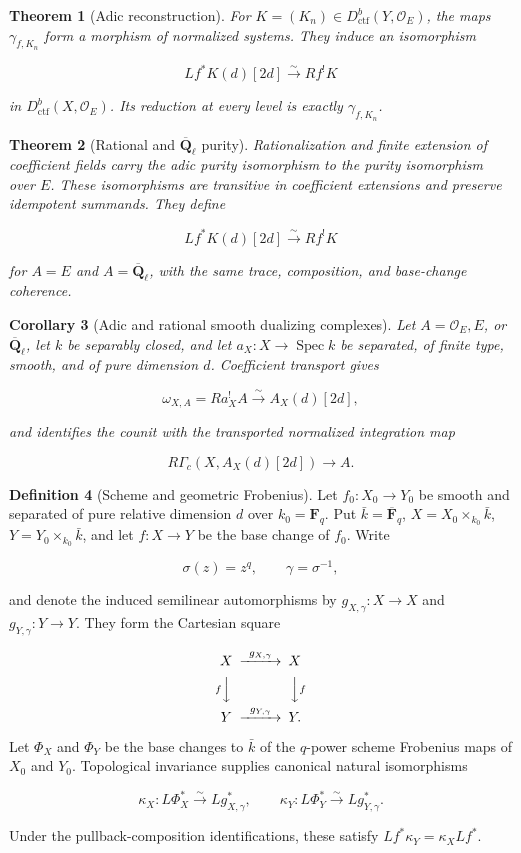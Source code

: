 \documentclass[10pt]{article}
\newtheorem{theorem}{Theorem}[section]
\newtheorem{corollary}[theorem]{Corollary}
\theoremstyle{definition}
\newtheorem{definition}[theorem]{Definition}
\newcommand{\Qlb}{\overline{\mathbf Q}_\ell}
\newcommand{\OO}{\mathcal O}
\newcommand{\Dctf}{D^b_{\mathrm{ctf}}}
\begin{document}
\begin{theorem}[Adic reconstruction]
For \(K=(K_n)\in\Dctf(Y,\OO_E)\), the maps
\(\gamma_{f,K_n}\) form a morphism of normalized systems.  They induce an
isomorphism

\[
 Lf^*K(d)[2d]\xrightarrow{\sim}Rf^!K
\]

in \(\Dctf(X,\OO_E)\).  Its reduction at every level is exactly
\(\gamma_{f,K_n}\).
\end{theorem}

\begin{theorem}[Rational and \(\Qlb\) purity]
Rationalization and finite extension of coefficient fields carry the adic
purity isomorphism to the purity isomorphism over \(E\).  These isomorphisms
are transitive in coefficient extensions and preserve idempotent summands.
They define

\[
 Lf^*K(d)[2d]\xrightarrow{\sim}Rf^!K
\]

for \(A=E\) and \(A=\Qlb\), with the same trace, composition, and base-change
coherence.
\end{theorem}

\begin{corollary}[Adic and rational smooth dualizing complexes]
Let \(A=\OO_E,E\), or \(\Qlb\), let \(k\) be separably closed, and let
\(a_X:X\to\operatorname{Spec}k\) be separated, of finite type, smooth, and
of pure dimension \(d\).  Coefficient transport gives

\[
 \omega_{X,A}=Ra_X^!A\xrightarrow{\sim}A_X(d)[2d],
\]

and identifies the counit with the transported normalized integration map

\[
 R\Gamma_c(X,A_X(d)[2d])\longrightarrow A.
\]
\end{corollary}

\begin{definition}[Scheme and geometric Frobenius]
Let \(f_0:X_0\to Y_0\) be smooth and separated of pure relative dimension
\(d\) over \(k_0=\mathbf F_q\).  Put \(\bar k=\overline{\mathbf F}_q\),
\(X=X_0\times_{k_0}\bar k\), \(Y=Y_0\times_{k_0}\bar k\), and let
\(f:X\to Y\) be the base change of \(f_0\).  Write

\[
 \sigma(z)=z^q,\qquad \gamma=\sigma^{-1},
\]

and denote the induced semilinear automorphisms by
\(g_{X,\gamma}:X\to X\) and \(g_{Y,\gamma}:Y\to Y\).  They form the
Cartesian square

\[
\begin{CD}
X @>{g_{X,\gamma}}>> X\\
@V{f}VV @VV{f}V\\
Y @>{g_{Y,\gamma}}>> Y.
\end{CD}
\]

Let \(\Phi_X\) and \(\Phi_Y\) be the base changes to \(\bar k\) of the
\(q\)-power scheme Frobenius maps of \(X_0\) and \(Y_0\).  Topological
invariance supplies canonical natural isomorphisms

\[
 \kappa_X:L\Phi_X^*\xrightarrow{\sim}Lg_{X,\gamma}^*,
 \qquad
 \kappa_Y:L\Phi_Y^*\xrightarrow{\sim}Lg_{Y,\gamma}^*.
\]

Under the pullback-composition identifications, these satisfy
\(Lf^*\kappa_Y=\kappa_XLf^*\).
\end{definition}
\end{document}
